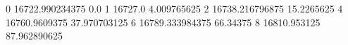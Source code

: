 0 16722.990234375 0.0
1 16727.0 4.009765625
2 16738.216796875 15.2265625
4 16760.9609375 37.970703125
6 16789.333984375 66.34375
8 16810.953125 87.962890625
